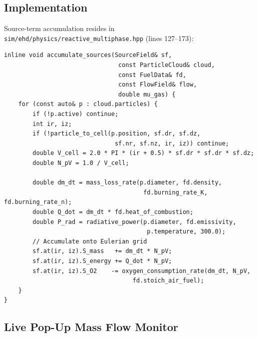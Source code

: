 \documentclass[11pt,a4paper]{article}
\begin{document}
\subsection{Implementation}

Source-term accumulation resides in
\texttt{sim/ehd/physics/reactive\_multiphase.hpp} (lines 127--173):

\begin{lstlisting}[style=cpp,title={\textbf{C++ --- Eulerian source-term accumulation}}]
inline void accumulate_sources(SourceField& sf,
                                const ParticleCloud& cloud,
                                const FuelData& fd,
                                const FlowField& flow,
                                double mu_gas) {
    for (const auto& p : cloud.particles) {
        if (!p.active) continue;
        int ir, iz;
        if (!particle_to_cell(p.position, sf.dr, sf.dz,
                               sf.nr, sf.nz, ir, iz)) continue;
        double V_cell = 2.0 * PI * (ir + 0.5) * sf.dr * sf.dr * sf.dz;
        double N_pV = 1.0 / V_cell;

        double dm_dt = mass_loss_rate(p.diameter, fd.density,
                                       fd.burning_rate_K, fd.burning_rate_n);
        double Q_dot = dm_dt * fd.heat_of_combustion;
        double P_rad = radiative_power(p.diameter, fd.emissivity,
                                        p.temperature, 300.0);
        // Accumulate onto Eulerian grid
        sf.at(ir, iz).S_mass   += dm_dt * N_pV;
        sf.at(ir, iz).S_energy += Q_dot * N_pV;
        sf.at(ir, iz).S_O2    -= oxygen_consumption_rate(dm_dt, N_pV,
                                    fd.stoich_air_fuel);
    }
}
\end{lstlisting}

\subsection{Live Pop-Up Mass Flow Monitor}
\end{document}
